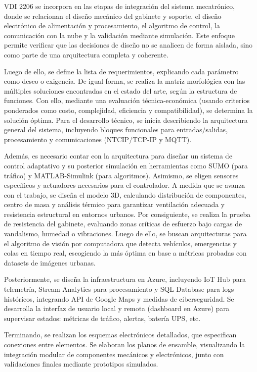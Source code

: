 \documentclass[12pt,a4paper,oneside]{report}
\begin{document}
VDI 2206 se incorpora en las etapas de integración del sistema mecatrónico, donde se relacionan el diseño mecánico del gabinete y soporte, el diseño electrónico de alimentación y procesamiento, el algoritmo de control, la comunicación con la nube y la validación mediante simulación. Este enfoque permite verificar que las decisiones de diseño no se analicen de forma aislada, sino como parte de una arquitectura completa y coherente.

Luego de ello, se define la lista de requerimientos, explicando cada parámetro como deseo o exigencia. De igual forma, se realiza la matriz morfológica con las múltiples soluciones encontradas en el estado del arte, según la estructura de funciones. Con ello, mediante una evaluación técnica-económica (usando criterios ponderados como costo, complejidad, eficiencia y compatibilidad), se determina la solución óptima. Para el desarrollo técnico, se inicia describiendo la arquitectura general del sistema, incluyendo bloques funcionales para entradas/salidas, procesamiento y comunicaciones (NTCIP/TCP-IP y MQTT).

Además, es necesario contar con la arquitectura para diseñar un sistema de control adaptativo y su posterior simulación en herramientas como SUMO (para tráfico) y MATLAB-Simulink (para algoritmos). Asimismo, se eligen sensores específicos y actuadores necesarios para el controlador. A medida que se avanza con el trabajo, se diseña el modelo 3D, calculando distribución de componentes, centro de masa y análisis térmico para garantizar ventilación adecuada y resistencia estructural en entornos urbanos. Por consiguiente, se realiza la prueba de resistencia del gabinete, evaluando zonas críticas de esfuerzo bajo cargas de vandalismo, humedad o vibraciones. Luego de ello, se buscan arquitecturas para el algoritmo de visión por computadora que detecta vehículos, emergencias y colas en tiempo real, escogiendo la más óptima en base a métricas probadas con datasets de imágenes urbanas.

Posteriormente, se diseña la infraestructura en Azure, incluyendo IoT Hub para telemetría, Stream Analytics para procesamiento y SQL Database para logs históricos, integrando API de Google Maps y medidas de ciberseguridad. Se desarrolla la interfaz de usuario local y remota (dashboard en Azure) para supervisar estados: métricas de tráfico, alertas, batería UPS, etc.

Terminando, se realizan los esquemas electrónicos detallados, que especifican conexiones entre elementos. Se elaboran los planos de ensamble, visualizando la integración modular de componentes mecánicos y electrónicos, junto con validaciones finales mediante prototipos simulados.
\end{document}
